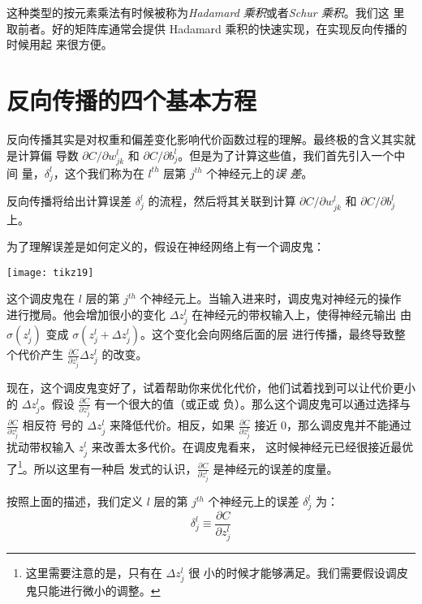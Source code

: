 这种类型的按元素乘法有时候被称为\emph{Hadamard 乘积}或者\emph{Schur 乘积}。我们这
里取前者。好的矩阵库通常会提供 Hadamard 乘积的快速实现，在实现反向传播的时候用起
来很方便。

\section{反向传播的四个基本方程}
\label{sec:the_four_fundamental_equations_behind_backpropagation}

反向传播其实是对权重和偏差变化影响代价函数过程的理解。最终极的含义其实就是计算偏
导数 $\partial C/\partial w_{jk}^l$ 和
$\partial C/\partial b_j^l$。但是为了计算这些值，我们首先引入一个中间
量，$\delta_j^l$，这个我们称为在 $l^{th}$ 层第 $j^{th}$ 个神经元上的\emph{误
  差}。

反向传播将给出计算误差 $\delta_j^l$ 的流程，然后将其关联到计算 $\partial
C/\partial w_{jk}^l$ 和 $\partial C/\partial b_j^l$ 上。

为了理解误差是如何定义的，假设在神经网络上有一个调皮鬼：

\begin{center}
  \texttt{[image: tikz19]}
\end{center}

这个调皮鬼在 $l$ 层的第 $j^{th}$ 个神经元上。当输入进来时，调皮鬼对神经元的操作
进行搅局。他会增加很小的变化 $\Delta z_j^l$ 在神经元的带权输入上，使得神经元输出
由 $\sigma(z_j^l)$ 变成 $\sigma(z_j^l + \Delta z_j^l)$。这个变化会向网络后面的层
进行传播，最终导致整个代价产生 $\frac{\partial C}{\partial z_j^l} \Delta z_j^l$
的改变。

现在，这个调皮鬼变好了，试着帮助你来优化代价，他们试着找到可以让代价更小的
$\Delta z_j^l$。假设 $\frac{\partial C}{\partial z_j^l}$ 有一个很大的值（或正或
  负）。那么这个调皮鬼可以通过选择与 $\frac{\partial C}{\partial z_j^l}$ 相反符
号的 $\Delta z_j^l$ 来降低代价。相反，如果 $\frac{\partial C}{\partial z_j^l}$
接近 $0$，那么调皮鬼并不能通过扰动带权输入 $z_j^l$ 来改善太多代价。在调皮鬼看来，
这时候神经元已经很接近最优了\footnote{这里需要注意的是，只有在 $\Delta z_j^l$ 很
  小的时候才能够满足。我们需要假设调皮鬼只能进行微小的调整。}。所以这里有一种启
发式的认识，$\frac{\partial C}{\partial z_j^l}$ 是神经元的误差的度量。

按照上面的描述，我们定义 $l$ 层的第 $j^{th}$ 个神经元上的误差 $\delta_j^l$ 为：
\begin{equation}
  \delta^l_j \equiv \frac{\partial C}{\partial z^l_j}
  \label{eq:29}\tag{29}
\end{equation}


